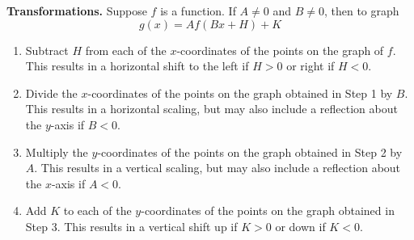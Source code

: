 \bigskip

\colorbox{ResultColor}{\bbm


\begin{thm} \label{transformationsthm}\textbf{Transformations.}  Suppose $f$ is a function.  If $A \neq 0$ and $B \neq 0$, then to graph \[g(x) = A f(Bx+H)+K\] 

\begin{enumerate}

\item  Subtract $H$ from each of the $x$-coordinates of the points on the graph of $f$.  This results in a horizontal shift to the left if $H > 0$ or right if $H< 0$.

\item  Divide the $x$-coordinates of the points on the graph obtained in Step 1 by $B$.  This results in a horizontal scaling, but may also include a reflection about the $y$-axis if $B < 0$.

\item  Multiply the $y$-coordinates of the points on the graph obtained in Step 2 by $A$.   This results in a vertical scaling, but may also include a reflection about the $x$-axis if $A < 0$.

\item  Add $K$ to each of the $y$-coordinates of the points on the graph obtained in Step 3.  This results in a vertical shift up if $K > 0$ or down if $K< 0$.

\end{enumerate}

\end{thm}

\ebm}

\bigskip

